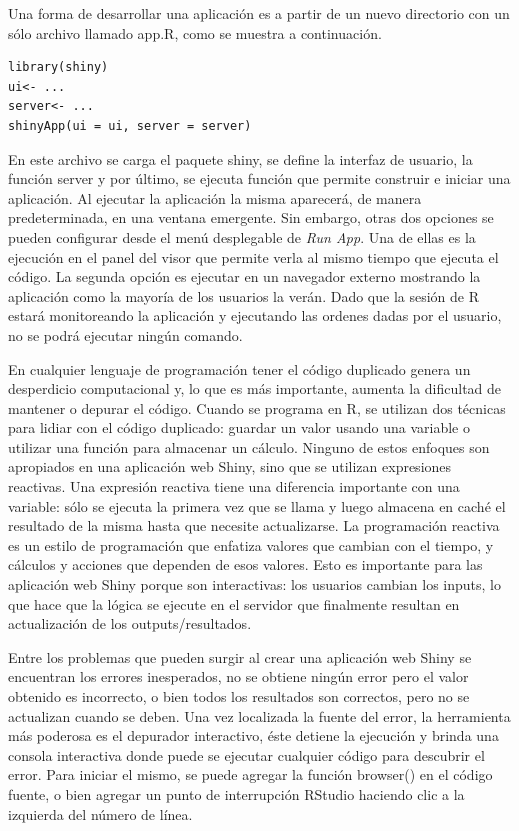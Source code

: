 Una forma de desarrollar una  aplicación es a partir de un nuevo directorio con un sólo archivo llamado app.R, como se muestra a continuación. 

\begin{lstlisting}
library(shiny)
ui<- ...
server<- ...
shinyApp(ui = ui, server = server)
\end{lstlisting}

En este archivo se carga el paquete shiny, se define la interfaz de usuario, la función server y por último, se ejecuta función que permite construir e iniciar una aplicación. Al ejecutar la aplicación la misma aparecerá, de manera predeterminada, en una ventana emergente. Sin embargo, otras dos opciones se pueden configurar desde el menú desplegable de \emph{Run App}. Una de ellas es la ejecución en el panel del visor que permite verla al mismo tiempo que ejecuta el código. La segunda opción es ejecutar en un navegador externo mostrando la aplicación como la mayoría de los usuarios la verán. Dado que la sesión de R estará monitoreando la aplicación y ejecutando las ordenes dadas por el usuario, no se podrá ejecutar ningún comando.

En cualquier lenguaje de programación tener el código duplicado genera un desperdicio computacional y, lo que es más importante, aumenta la dificultad de mantener o depurar el código. Cuando se programa en R, se utilizan dos técnicas para lidiar con el código duplicado: guardar un valor usando una variable o utilizar una función para almacenar un cálculo. Ninguno de estos enfoques son apropiados en una aplicación web Shiny, sino que se utilizan expresiones reactivas. Una expresión reactiva tiene una diferencia importante con una variable: sólo se ejecuta la primera vez que se llama y luego almacena en caché el resultado de la misma hasta que necesite actualizarse. La programación reactiva es un estilo de programación que enfatiza valores que cambian con el tiempo, y cálculos y acciones que dependen de esos valores. Esto es importante para las aplicación web Shiny porque son interactivas: los usuarios cambian los inputs, lo que hace que la lógica se ejecute en el servidor que finalmente resultan en actualización de los outputs/resultados.

Entre los problemas que pueden surgir al crear una aplicación web Shiny se encuentran los errores inesperados, no se obtiene ningún error pero el valor obtenido es incorrecto, o bien todos los resultados son correctos, pero no se actualizan cuando se deben. Una vez localizada la fuente del error, la herramienta más poderosa es el depurador interactivo, éste detiene la ejecución y brinda una consola interactiva donde puede se ejecutar cualquier código para descubrir el error. Para iniciar el mismo, se puede agregar la función browser() en el código fuente, o bien agregar un punto de interrupción RStudio haciendo clic a la izquierda del número de línea.

